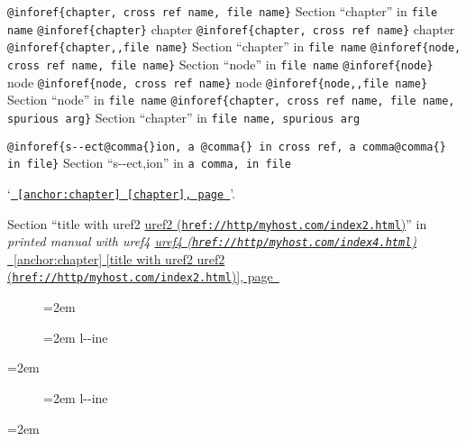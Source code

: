 \documentclass{book}
\begin{document}
\texttt{@inforef\{chapter, cross ref name, file name\}} Section ``chapter'' in \texttt{file name}
\texttt{@inforef\{chapter\}} chapter
\texttt{@inforef\{chapter, cross ref name\}} chapter
\texttt{@inforef\{chapter,,file name\}} Section ``chapter'' in \texttt{file name}
\texttt{@inforef\{node, cross ref name, file name\}} Section ``node'' in \texttt{file name}
\texttt{@inforef\{node\}} node
\texttt{@inforef\{node, cross ref name\}} node
\texttt{@inforef\{node,,file name\}} Section ``node'' in \texttt{file name}
\texttt{@inforef\{chapter, cross ref name, file name, spurious arg\}} Section ``chapter'' in \texttt{file name, spurious arg}

\texttt{@inforef\{s{-}{-}ect@comma\{\}ion, a @comma\{\} in cross
ref, a comma@comma\{\} in file\}}
Section ``s{-}{-}ect,ion'' in \texttt{a comma, in file}

`\texttt{\hyperref[anchor:chapter]{\chaptername~\ref*{anchor:chapter} [chapter], page~\pageref*{anchor:chapter}}}'.

Section ``title with uref2 \href{href://http/myhost.com/index2.html}{uref2 (\nolinkurl{href://http/myhost.com/index2.html})}'' in \textit{printed manual with uref4 \href{href://http/myhost.com/index4.html}{uref4 (\nolinkurl{href://http/myhost.com/index4.html})}}
\hyperref[anchor:chapter]{\chaptername~\ref*{anchor:chapter} [title with uref2 \href{href://http/myhost.com/index2.html}{uref2 (\nolinkurl{href://http/myhost.com/index2.html})}], page~\pageref*{anchor:chapter}}

\endgroup{}%
\begin{description}
\item[] \par\begingroup\obeylines\obeyspaces\frenchspacing\leftskip=2em\relax\parskip=0pt\relax\ttfamily{}%
\endgroup{}%
\item[{\parbox[b]{\linewidth}{%
\textbf{a--strong}}}]
\par\begingroup\obeylines\obeyspaces\frenchspacing\leftskip=2em\relax\parskip=0pt\relax\ttfamily{}%
l{-}{-}ine
\endgroup{}%
\end{description}
\par\begingroup\obeylines\obeyspaces\frenchspacing\leftskip=2em\relax\parskip=0pt\relax\ttfamily{}%

\endgroup{}%
\begin{description}
\item[{\parbox[b]{\linewidth}{%
a--asis\\
\index[cp]{a--asis@\texttt{a{-}{-}asis}}%
b
\index[cp]{b@\texttt{b}}%
}}]
\par\begingroup\obeylines\obeyspaces\frenchspacing\leftskip=2em\relax\parskip=0pt\relax\ttfamily{}%
l{-}{-}ine
\endgroup{}%
\end{description}
\par\begingroup\obeylines\obeyspaces\frenchspacing\leftskip=2em\relax\parskip=0pt\relax\ttfamily{}%
\end{document}

